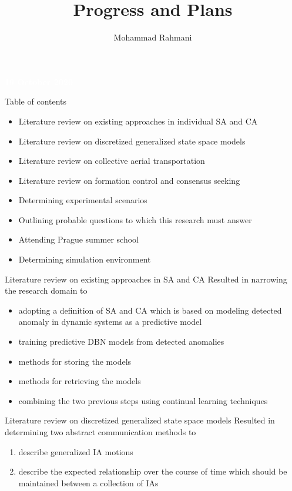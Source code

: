 \documentclass[unknownkeysallowed]{beamer}
\title{Progress and Plans}
\author{Mohammad Rahmani}
\institute{Decide Doctoral School}
\begin{document}
	\begin{frame}
		\date{}
		\maketitle
		\textcolor{white}{\textbf{19 October 2020}}
	\end{frame}
	
	\begin{frame}{Table of contents}
		\begin{itemize}
			\item Literature review on existing approaches in individual SA and CA
			\item Literature review on discretized generalized state space models
			\item Literature review on collective aerial transportation
			\item Literature review on formation control and consensus seeking
			\item Determining experimental scenarios
			\item Outlining probable questions to which this research must answer
			\item Attending Prague summer school
			\item Determining simulation environment
		\end{itemize}
	\end{frame}

	\begin{frame}{Literature review on existing approaches in SA and CA}
		Resulted in narrowing the research domain to
		\begin{itemize}
			\item adopting a definition of SA and CA which is based on modeling detected anomaly in dynamic systems as a predictive model
			\item training predictive DBN models from detected anomalies 
			\item methods for storing the models
			\item methods for retrieving the models
			\item combining the two previous steps using continual learning techniques
		\end{itemize}
	\end{frame}

	\begin{frame}{Literature review on discretized generalized state space models}
	 Resulted in determining two abstract communication methods to
		\begin{enumerate}
			\item describe generalized IA motions
			\item describe the expected relationship over the course of time which should be maintained between a collection of IAs 
		\end{enumerate}
	\end{frame}
\end{document}
